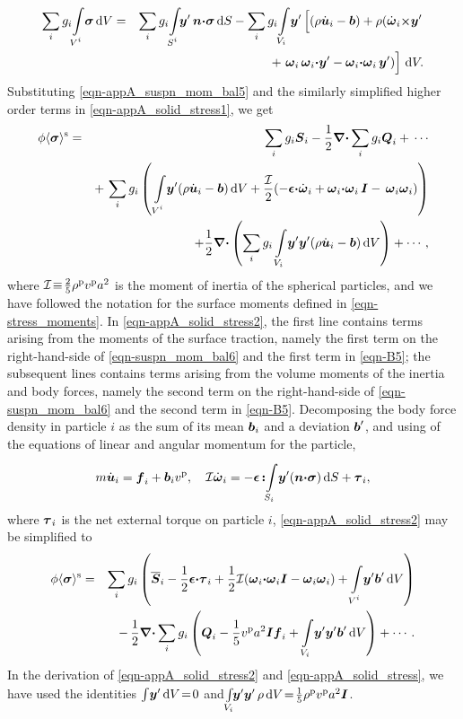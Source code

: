 \documentclass[aip,pof,preprint]{report}
\newcommand{\te}[1]{\mbox{\boldmath $#1$}}
\newcommand{\Frac}[2]{\frac{\displaystyle #1}{\displaystyle #2}}
\newcommand{\be}{\begin{equation}}
\newcommand{\ee}{\end{equation}}
\newcommand{\bea}{\begin{eqnarray}}
\newcommand{\eea}{\end{eqnarray}}
\newcommand{\Div}{\te{\nabla \cdot}}
\newcommand{\bdot}{\te{\cdot}}
\newcommand{\avg}[1]{\langle #1 \rangle}
\newcommand{\subtext}[1]{\mbox{\scriptsize #1}}
\newcommand{\varint}[2]{\int\limits_{\mbox{\scriptsize $#1$}}^{\mbox{\scriptsize $#2$}}\!}
\newcommand{\dup}{{\mathrm d}}
\newcommand{\rhop}{\rho^{\subtext{p}}}
\newcommand{\vp}{v^{\subtext{p}}}
\newcommand{\cross}[2]{#1 \mbox{\small \te{\times}} #2}
\newcommand{\sigmas}{\avg{\te{\sigma}}^{\subtext{s}}}
\begin{document}
\bea
	\sum_i g_i \! \varint{V^i}{} \te{\sigma} \, \dup V & = & \sum_i g_i \! \varint{S^i}{} \! \te{y}' \, \te{n} \bdot \te{\sigma} \, \dup S - \sum_i g_i \! \varint{V_i}{} \te{y}'  \left[ \rule{0em}{1em} (\rho \dot{\te{u}}_i - \te{b}) + \rho(\cross{\dot{\te{\omega}}_i}{\te{y}'}  \right. \nonumber \\
	& & \left. + \,\, \te{\omega}_i \,\te{\omega}_i \bdot \te{y}' - \te{\omega}_i \bdot \te{\omega}_i \, \te{y}') \rule{0em}{1em} \right] \, \dup V.
\label{eqn-appA_suspn_mom_bal5}
\eea
Substituting \eqref{eqn-appA_suspn_mom_bal5} and the similarly simplified higher order terms in \eqref{eqn-appA_solid_stress1}, we get
\bea
	\phi \sigmas & = & \sum_{i}  g_i \te{S}_i   - \Frac{1}{2} \Div \sum_{i}  g_i \te{Q}_i  + \, \cdots \nonumber \\
	& & + \, \sum_{i}  g_i \left( \, \varint{V^i}{} \te{y}' (\rho \dot{\te{u}}_i - \te{b}) \, \dup V + \frac{\mathcal{I}}{2} ( -\te{\epsilon} \bdot \dot{\te{\omega}}_i + \te{\omega}_i \bdot \te{\omega}_i \, \te{I} - \, \te{\omega}_i \te{\omega}_i ) \right)  \nonumber \\
	& & + \Frac{1}{2} \Div \left( \sum_{i}  g_i \varint{V_i}{} \te{y}' \te{y}' (\rho \dot{\te{u}}_i - \te{b}) \, \dup V \right) + \cdots,
\label{eqn-appA_solid_stress2}
\eea
where $\mathcal{I} \! \equiv \!  \frac{2}{5} \rhop  \vp a^2$ is the moment of inertia of the spherical particles, and we have followed the notation for the surface moments defined in \eqref{eqn-stress_moments}.  In \eqref{eqn-appA_solid_stress2}, the first line contains terms arising from the moments of the surface traction, namely the first term on the right-hand-side of \eqref{eqn-suspn_mom_bal6} and the first term in \eqref{eqn-B5}; the subsequent lines contains terms arising from the volume moments of the inertia and body forces, namely the second term on the right-hand-side of \eqref{eqn-suspn_mom_bal6} and the second term in \eqref{eqn-B5}.  Decomposing the body force density in particle $i$ as the sum of its mean $\te{b}_i$ and a deviation $\te{b}'$, and using of the equations of linear and angular momentum for the particle,
\be
	m \dot{\te{u}}_i  = \te{f}_i + \te{b}_i v^{\subtext{p}},  \quad \mathcal{I} \dot{\te{\omega}}_i  =  - \te{\epsilon} \, \te{:} \! \varint{S_i}{} \te{y}' (\te{n} \bdot \te{\sigma}) \, \dup S + \te{\tau}_i,
\label{eqn-appA_part_eqns_motion}
\ee
where $\te{\tau}_i$ is the net external torque on particle $i$, \eqref{eqn-appA_solid_stress2} may be simplified to
\bea
	\phi \sigmas & = & \sum_{i}  g_i \left( \overline{\te{S}}_i - \frac{1}{2} \te{\epsilon} \bdot \te{\tau}_i + \frac{1}{2} \mathcal{I} (\te{\omega}_i \bdot \te{\omega}_i  \te{I} - \te{\omega}_i \te{\omega}_i) + \varint{V^i}{} \te{y}' \te{b}' \, \dup V \right)  \nonumber \\
	& &  - \,  \Frac{1}{2} \Div \sum_{i}  g_i \left( \te{Q}_i  - \Frac{1}{5} \vp a^2 \te{I} \te{f}_i + \varint{V_i}{} \te{y}' \te{y}' \te{b}' \, \dup V \right) +  \cdots.
\label{eqn-appA_solid_stress}
\eea
In the derivation of \eqref{eqn-appA_solid_stress2} and \eqref{eqn-appA_solid_stress}, we have used the identities $\int \! \te{y}' \, \dup V \! = \! 0$ and$\varint{V_i}{} \! \te{y}' \te{y}' \, \rho \, \dup V \! = \! \frac{1}{5} \rhop  \vp a^2 \te{I}$.
\end{document}
